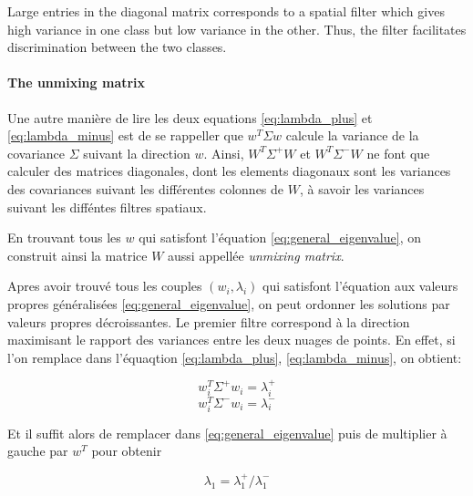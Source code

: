 Large entries in the diagonal matrix corresponds to a spatial filter which gives high variance in one class but low variance in the other. Thus, the filter facilitates discrimination between the two classes.

\paragraph{The unmixing matrix}

Une autre manière de lire les deux equations \ref{eq:lambda_plus} et \ref{eq:lambda_minus} est de se rappeller que $w^{T}\Sigma w$ calcule la variance de la covariance $\Sigma$ suivant la direction $w$. Ainsi, $W^{T} \Sigma^{+} W$ et $W^{T} \Sigma^{-} W$ ne font que calculer des matrices diagonales, dont les elements diagonaux sont les variances des covariances suivant les différentes colonnes de $W$, à savoir les variances suivant les difféntes filtres spatiaux.

En trouvant tous les $w$ qui satisfont l'équation \ref{eq:general_eigenvalue}, on construit ainsi la matrice $W$ aussi appellée \textit{unmixing matrix}.

Apres avoir trouvé tous les couples $(w_i, \lambda_i)$ qui satisfont l'équation aux valeurs propres généralisées \ref{eq:general_eigenvalue}, on peut ordonner les solutions par valeurs propres décroissantes. Le premier filtre correspond à la direction maximisant le rapport des variances entre les deux nuages de points. En effet, si l'on remplace dans l'équaqtion \ref{eq:lambda_plus}, \ref{eq:lambda_minus}, on obtient:

\begin{equation}
    w^{T}_{i} \Sigma^{+} w_{i} = \lambda^{+}_{i}
    \label{eq:lambda_plus_first_component}
\end{equation}
\begin{equation}
    w^{T}_{i} \Sigma^{-} w_{i} = \lambda^{-}_{i}
    \label{eq:lambda_minus_first_component}
\end{equation}

Et il suffit alors de remplacer dans \ref{eq:general_eigenvalue} puis de multiplier à gauche par $w^{T}$ pour obtenir

\begin{equation}
    \lambda_1 = \lambda^{+}_1 / \lambda^{-}_1
\end{equation}


